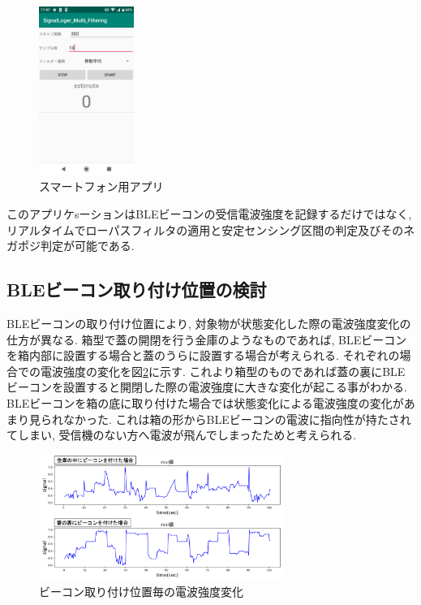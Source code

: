 \documentclass[Japanese]{dicomopapers}
\begin{document}
\begin{figure}[ht]
    \centering
    \includegraphics[height=5.5cm]{application.jpg}
    \caption{スマートフォン用アプリ}
    \label{phoneApp}
\end{figure}
このアプリケsーションはBLEビーコンの受信電波強度を記録するだけではなく, リアルタイムでローパスフィルタの適用と安定センシング区間の判定及びそのネガポジ判定が可能である.






\subsection{BLEビーコン取り付け位置の検討}
BLEビーコンの取り付け位置により, 対象物が状態変化した際の電波強度変化の仕方が異なる.
箱型で蓋の開閉を行う金庫のようなものであれば, BLEビーコンを箱内部に設置する場合と蓋のうらに設置する場合が考えられる.
それぞれの場合での電波強度の変化を図\ref{transform-data}に示す.
これより箱型のものであれば蓋の裏にBLEビーコンを設置すると開閉した際の電波強度に大きな変化が起こる事がわかる.
BLEビーコンを箱の底に取り付けた場合では状態変化による電波強度の変化があまり見られなかった.
これは箱の形からBLEビーコンの電波に指向性が持たされてしまい, 受信機のない方へ電波が飛んでしまったためと考えられる.

\begin{figure}[t]
 \centering
 \includegraphics[width=8cm]{in-out.png}
 \caption{ビーコン取り付け位置毎の電波強度変化}
 \label{transform-data}
\end{figure}
\end{document}
